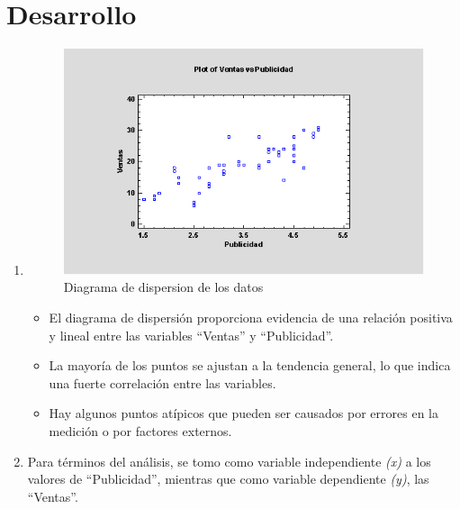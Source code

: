 \documentclass[conference]{IEEEtran}
\begin{document}
\section{Desarrollo}

\begin{enumerate}
	\item \hfill{}
	      \begin{figure}[H]
		      \begin{center}
			      \includegraphics[width=\linewidth]{./Images/DiagramaDispersion.png}
		      \end{center}
		      \caption{Diagrama de dispersion de los datos}
	      \end{figure}

	      \begin{itemize}
		      \item El diagrama de dispersión proporciona evidencia de una relación
		            positiva y lineal entre las variables ``Ventas'' y ``Publicidad''.

		      \item La mayoría de los puntos se ajustan a la tendencia general, lo que
		            indica una fuerte correlación entre las variables.

		      \item Hay algunos puntos atípicos que pueden ser causados por errores en
		            la medición o por factores externos.
	      \end{itemize}

	\item Para términos del análisis, se tomo como variable
	      independiente \textit{(x)} a los valores de ``Publicidad'', mientras
	      que como variable dependiente \textit{(y)}, las ``Ventas''.


\end{enumerate}
\end{document}

